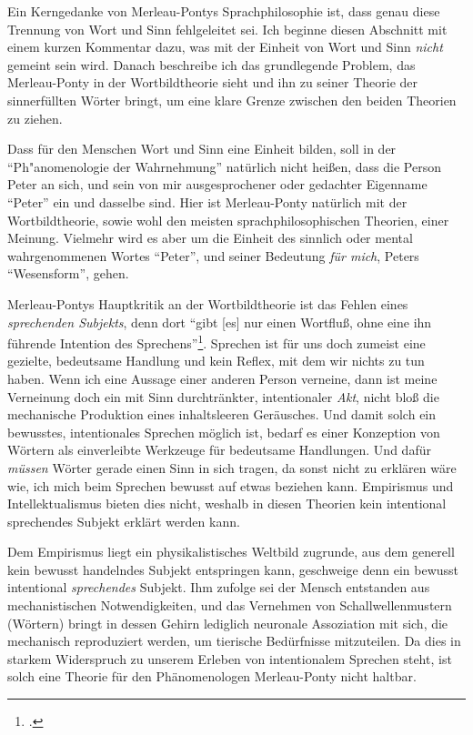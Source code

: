 \documentclass[a4paper, 12pt]{article}
\begin{document}
\begin{onehalfspace}
\noindent Ein Kerngedanke von Merleau-Pontys Sprachphilosophie ist, dass genau diese Trennung von Wort und Sinn fehlgeleitet sei. Ich beginne diesen Abschnitt mit einem kurzen Kommentar dazu, was mit der Einheit von Wort und Sinn \emph{nicht} gemeint sein wird. Danach beschreibe ich das grundlegende Problem, das Merleau-Ponty in der Wortbildtheorie sieht und ihn zu seiner Theorie der sinnerfüllten Wörter bringt, um eine klare Grenze zwischen den beiden Theorien zu ziehen.

Dass für den Menschen Wort und Sinn eine Einheit bilden, soll in der "`Ph"anomenologie der Wahrnehmung"' natürlich nicht heißen, dass die Person Peter an sich, und sein von mir ausgesprochener oder gedachter Eigenname "`Peter"' ein und dasselbe sind. Hier ist Merleau-Ponty natürlich mit der Wortbildtheorie, sowie wohl den meisten sprachphilosophischen Theorien, einer Meinung. Vielmehr wird es aber um die Einheit des sinnlich oder mental wahrgenommenen Wortes "`Peter"', und seiner Bedeutung \emph{für mich}, Peters "`Wesensform"', gehen. 

Merleau-Pontys Hauptkritik an der Wortbildtheorie ist das Fehlen eines \emph{sprechenden Subjekts}, denn dort "`gibt [es] nur einen Wortfluß, ohne eine ihn führende Intention des Sprechens"'\footnote{\Cite[Siehe][S. 208]{merleau1966phanomenologie}.}. Sprechen ist für uns doch zumeist eine gezielte, bedeutsame Handlung und kein Reflex, mit dem wir nichts zu tun haben. Wenn ich eine Aussage einer anderen Person verneine, dann ist meine Verneinung doch ein mit Sinn durchtränkter, intentionaler \emph{Akt}, nicht bloß die mechanische Produktion eines inhaltsleeren Geräusches. Und damit solch ein bewusstes, intentionales Sprechen möglich ist, bedarf es einer Konzeption von Wörtern als einverleibte Werkzeuge für bedeutsame Handlungen. Und dafür \emph{müssen} Wörter gerade einen Sinn in sich tragen, da sonst nicht zu erklären wäre wie, ich mich beim Sprechen bewusst auf etwas beziehen kann. Empirismus und Intellektualismus bieten dies nicht, weshalb in diesen Theorien kein intentional sprechendes Subjekt erklärt werden kann.

Dem Empirismus liegt ein physikalistisches Weltbild zugrunde, aus dem generell kein bewusst handelndes Subjekt entspringen kann, geschweige denn ein bewusst intentional \emph{sprechendes} Subjekt. Ihm zufolge sei der Mensch entstanden aus mechanistischen Notwendigkeiten, und das Vernehmen von Schallwellenmustern (Wörtern) bringt in dessen Gehirn lediglich neuronale Assoziation mit sich, die mechanisch reproduziert werden, um tierische Bedürfnisse mitzuteilen. Da dies in starkem Widerspruch zu unserem Erleben von intentionalem Sprechen steht, ist solch eine Theorie für den Phänomenologen Merleau-Ponty nicht haltbar.


\end{onehalfspace}
\end{document}
